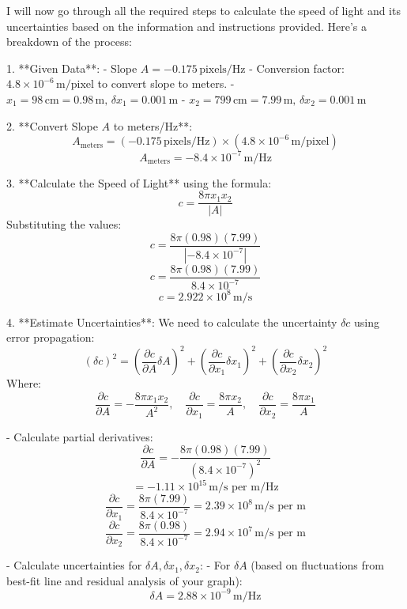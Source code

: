 I will now go through all the required steps to calculate the speed of light and its uncertainties based on the information and instructions provided. Here’s a breakdown of the process:

1. **Given Data**:
   - Slope \( A = -0.175 \, \text{pixels/Hz} \)
   - Conversion factor: \( 4.8 \times 10^{-6} \, \text{m/pixel} \) to convert slope to meters.
   - \( x_1 = 98 \, \text{cm} = 0.98 \, \text{m}, \, \delta x_1 = 0.001 \, \text{m} \)
   - \( x_2 = 799 \, \text{cm} = 7.99 \, \text{m}, \, \delta x_2 = 0.001 \, \text{m} \)

2. **Convert Slope \( A \) to meters/Hz**:
   \[
   A_{\text{meters}} = (-0.175 \, \text{pixels/Hz}) \times (4.8 \times 10^{-6} \, \text{m/pixel})
   \]
   \[
   A_{\text{meters}} = -8.4 \times 10^{-7} \, \text{m/Hz}
   \]

3. **Calculate the Speed of Light** using the formula:
   \[
   c = \frac{8 \pi x_1 x_2}{|A|}
   \]
   Substituting the values:
   \[
   c = \frac{8 \pi (0.98) (7.99)}{| -8.4 \times 10^{-7} |}
   \]
   \[
   c = \frac{8 \pi (0.98) (7.99)}{8.4 \times 10^{-7}}
   \]
   \[
   c = 2.922 \times 10^{8} \, \text{m/s}
   \]

4. **Estimate Uncertainties**:
   We need to calculate the uncertainty \( \delta c \) using error propagation:
   \[
   (\delta c)^2 = \left( \frac{\partial c}{\partial A} \delta A \right)^2 + \left( \frac{\partial c}{\partial x_1} \delta x_1 \right)^2 + \left( \frac{\partial c}{\partial x_2} \delta x_2 \right)^2
   \]
   Where:
   \[
   \frac{\partial c}{\partial A} = -\frac{8 \pi x_1 x_2}{A^2}, \quad \frac{\partial c}{\partial x_1} = \frac{8 \pi x_2}{A}, \quad \frac{\partial c}{\partial x_2} = \frac{8 \pi x_1}{A}
   \]

   - Calculate partial derivatives:
     \[
     \frac{\partial c}{\partial A} = -\frac{8 \pi (0.98) (7.99)}{(8.4 \times 10^{-7})^2}
     \]
     \[
     = -1.11 \times 10^{15} \, \text{m/s per m/Hz}
     \]
     \[
     \frac{\partial c}{\partial x_1} = \frac{8 \pi (7.99)}{8.4 \times 10^{-7}} = 2.39 \times 10^{8} \, \text{m/s per m}
     \]
     \[
     \frac{\partial c}{\partial x_2} = \frac{8 \pi (0.98)}{8.4 \times 10^{-7}} = 2.94 \times 10^{7} \, \text{m/s per m}
     \]

   - Calculate uncertainties for \( \delta A, \delta x_1, \delta x_2 \):
     - For \( \delta A \) (based on fluctuations from best-fit line and residual analysis of your graph):
       \[
       \delta A = 2.88 \times 10^{-9} \, \text{m/Hz}
       \]

